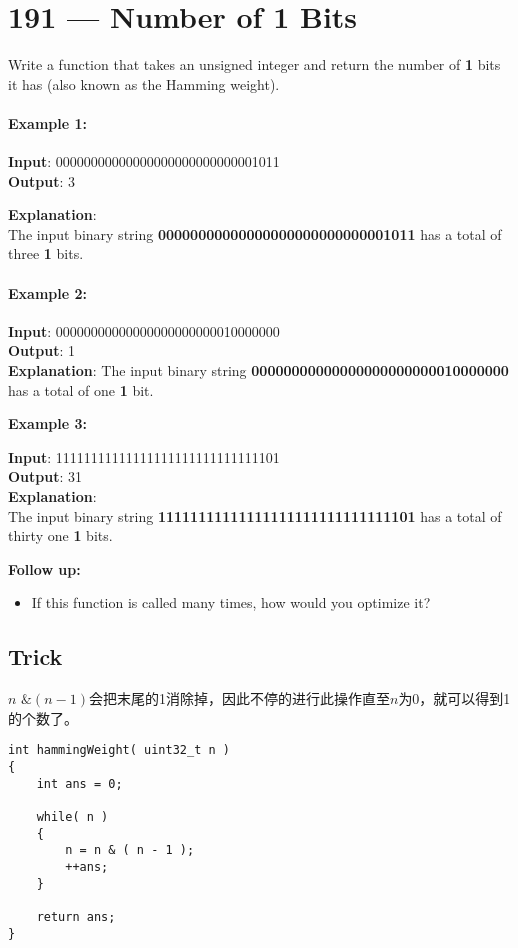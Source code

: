 \section{191 --- Number of 1 Bits}
Write a function that takes an unsigned integer and return the number of \textbf{1} bits it has (also known as the Hamming weight).
\paragraph{Example 1:}
\begin{flushleft}
\textbf{Input}: 00000000000000000000000000001011
\\
\textbf{Output}: 3

\textbf{Explanation}: 
\\
The input binary string \textbf{00000000000000000000000000001011} has a total of three \textbf{1} bits.
\end{flushleft}
\paragraph{Example 2:}
\begin{flushleft}
\textbf{Input}: 00000000000000000000000010000000
\\
\textbf{Output}: 1
\\
\textbf{Explanation}: The input binary string \textbf{00000000000000000000000010000000} has a total of one \textbf{1} bit.
\end{flushleft}
\textbf{Example 3:}
\begin{flushleft}
\textbf{Input}: 11111111111111111111111111111101
\\
\textbf{Output}: 31
\\
\textbf{Explanation}:
\\
The input binary string \textbf{11111111111111111111111111111101} has a total of thirty one \textbf{1} bits.
\end{flushleft}
\textbf{Follow up:}
\begin{itemize}
\item If this function is called many times, how would you optimize it?
\end{itemize}
\subsection{Trick}
\begin{CJK*}{UTF8}{gbsn}
$n \text{ \& } (n-1)$会把末尾的1消除掉，因此不停的进行此操作直至$n$为0，就可以得到1的个数了。
\end{CJK*}
\setcounter{lstlisting}{0}
\begin{lstlisting}[style=customc, caption={Bit Tricks}]
int hammingWeight( uint32_t n )
{
    int ans = 0;
	
    while( n )
    {
        n = n & ( n - 1 );
        ++ans;
    }

    return ans;
}
\end{lstlisting}
